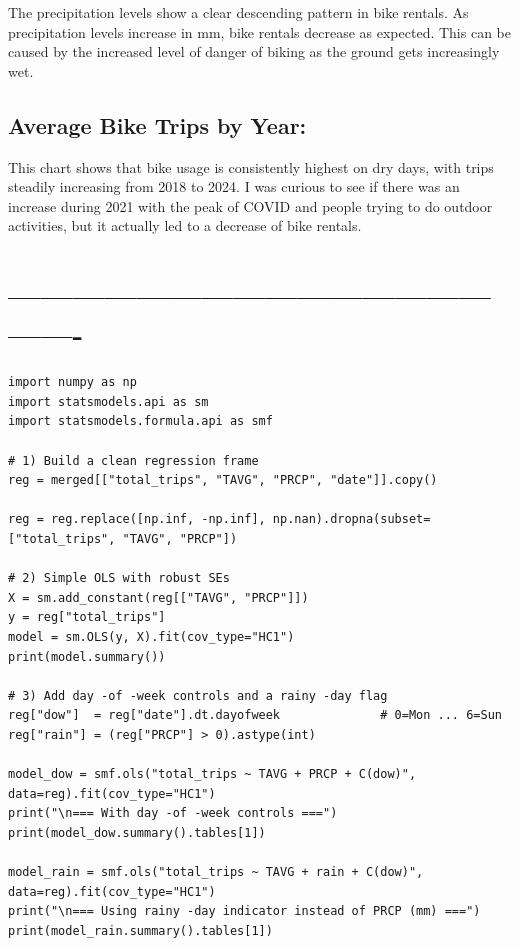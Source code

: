\documentclass{article}
\begin{document}
The precipitation levels show a clear descending pattern in bike rentals. As precipitation levels increase in mm, bike rentals decrease as expected. This can be caused by the increased level of danger of biking as the ground gets increasingly wet.

\subsection{\textbf{Average Bike Trips by Year:}}

This chart shows that bike usage is consistently highest on dry days, with trips steadily increasing from 2018 to 2024. I was curious to see if there was an increase during 2021 with the peak of COVID and people trying to do outdoor activities, but it actually led to a decrease of bike rentals.

\section{----------------------------------------------------}

\begin{verbatim}
import numpy as np
import statsmodels.api as sm
import statsmodels.formula.api as smf

# 1) Build a clean regression frame
reg = merged[["total_trips", "TAVG", "PRCP", "date"]].copy()

reg = reg.replace([np.inf, -np.inf], np.nan).dropna(subset=["total_trips", "TAVG", "PRCP"])

# 2) Simple OLS with robust SEs
X = sm.add_constant(reg[["TAVG", "PRCP"]])
y = reg["total_trips"]
model = sm.OLS(y, X).fit(cov_type="HC1")
print(model.summary())

# 3) Add day -of -week controls and a rainy -day flag
reg["dow"]  = reg["date"].dt.dayofweek              # 0=Mon ... 6=Sun
reg["rain"] = (reg["PRCP"] > 0).astype(int)

model_dow = smf.ols("total_trips ~ TAVG + PRCP + C(dow)", data=reg).fit(cov_type="HC1")
print("\n=== With day -of -week controls ===")
print(model_dow.summary().tables[1])

model_rain = smf.ols("total_trips ~ TAVG + rain + C(dow)", data=reg).fit(cov_type="HC1")
print("\n=== Using rainy -day indicator instead of PRCP (mm) ===")
print(model_rain.summary().tables[1])
\end{verbatim}
\end{document}
